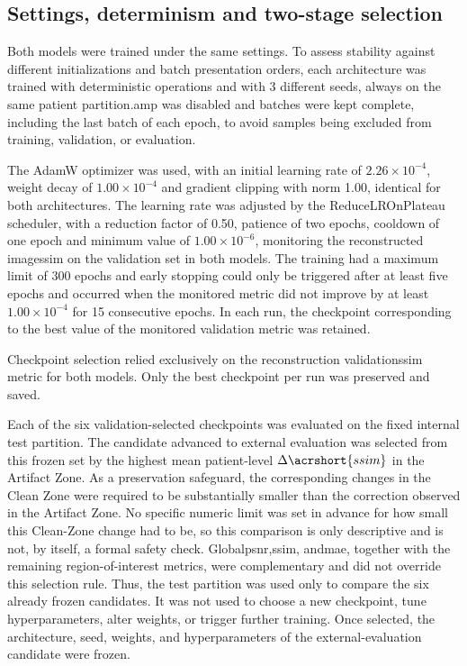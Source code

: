 \subsection{Settings, determinism and two-stage selection}

Both models were trained under the same settings. To assess stability against different initializations and batch presentation orders, each architecture was trained with deterministic operations and with 3 different seeds, always on the same patient partition.\acrfull{amp} was disabled and batches were kept complete, including the last batch of each epoch, to avoid samples being excluded from training, validation, or evaluation.

The AdamW optimizer was used, with an initial learning rate of $2{.}26 \times 10^{-4}$, weight decay of $1{.}00 \times 10^{-4}$ and gradient clipping with norm 1.00, identical for both architectures. The learning rate was adjusted by the ReduceLROnPlateau scheduler, with a reduction factor of 0.50, patience of two epochs, cooldown of one epoch and minimum value of $1{.}00 \times 10^{-6}$, monitoring the reconstructed image\acrshort{ssim} on the validation set in both models. The training had a maximum limit of 300 epochs and early stopping could only be triggered after at least five epochs and occurred when the monitored metric did not improve by at least $1{.}00 \times 10^{-4}$ for 15 consecutive epochs. In each run, the checkpoint corresponding to the best value of the monitored validation metric was retained.

Checkpoint selection relied exclusively on the reconstruction validation\acrshort{ssim} metric for both models. Only the best checkpoint per run was preserved and saved. 

Each of the six validation-selected checkpoints was evaluated on the fixed internal test partition. The candidate advanced to external evaluation was selected from this frozen set by the highest mean patient-level $\Delta\acrshort{ssim}$ in the Artifact Zone. As a preservation safeguard, the corresponding changes in the Clean Zone were required to be substantially smaller than the correction observed in the Artifact Zone. No specific numeric limit was set in advance for how small this Clean-Zone change had to be, so this comparison is only descriptive and is not, by itself, a formal safety check. Global\acrshort{psnr},\acrshort{ssim}, and\acrshort{mae}, together with the remaining region-of-interest metrics, were complementary and did not override this selection rule. Thus, the test partition was used only to compare the six already frozen candidates. It was not used to choose a new checkpoint, tune hyperparameters, alter weights, or trigger further training. Once selected, the architecture, seed, weights, and hyperparameters of the external-evaluation candidate were frozen.

